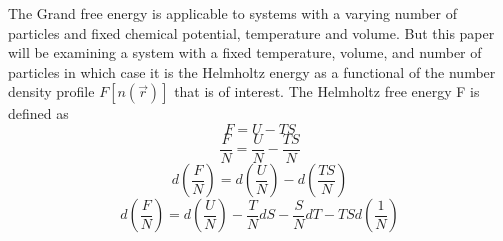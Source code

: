 \documentclass[12pt]{article}
\begin{document}
The Grand free energy is applicable to systems with a varying number of particles and fixed chemical potential, temperature and volume. But this paper will be examining a system with a fixed temperature, volume, and number of particles in which case it is the Helmholtz energy as a functional of the number density profile $F[n(\vec r)]$ that is of interest. 
The Helmholtz free energy F is defined as 
\begin{equation}F=U-TS\end{equation}
\begin{equation}\frac{F}{N}=\frac{U}{N}-\frac{TS}{N}\end{equation}
\begin{equation}\label{usetoshowmin}d\left(\frac{F}{N}\right)=d\left(\frac{U}{N}\right)-d\left(\frac{TS}{N}\right)\end{equation}
\begin{equation}d\left(\frac{F}{N}\right)=d\left(\frac{U}{N}\right)-\frac{T}{N}dS-\frac{S}{N}dT-TS d\left(\frac{1}{N}\right)\end{equation}
\end{document}
